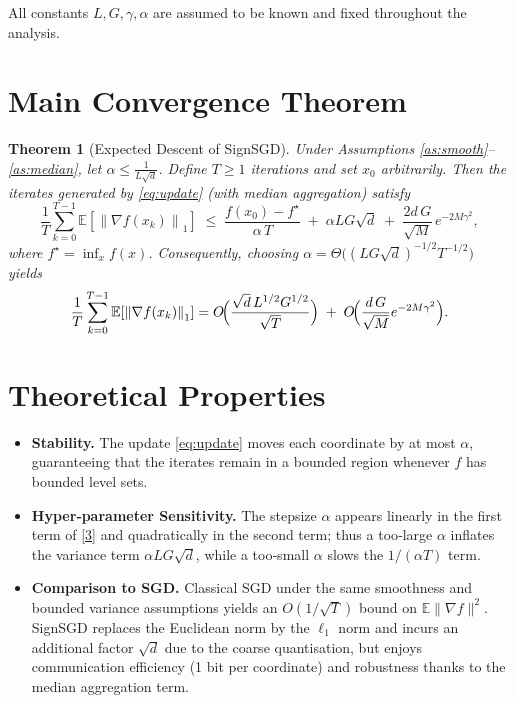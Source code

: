 \documentclass{article}
\newtheorem{theorem}{Theorem}
\newcommand{\E}{\mathbb{E}}
\newcommand{\norm}[1]{\left\lVert#1\right\rVert}
\begin{document}
All constants $L,G,\gamma,\alpha$ are assumed to be known and fixed throughout the analysis.

\section*{Main Convergence Theorem}
\begin{theorem}[Expected Descent of SignSGD]\label{thm:main}
Under Assumptions \ref{as:smooth}–\ref{as:median}, let $\alpha\le \frac{1}{L\sqrt{d}}$.
Define $T\ge 1$ iterations and set $x_{0}$ arbitrarily.
Then the iterates generated by \eqref{eq:update} (with median aggregation) satisfy
\[
\frac{1}{T}\sum_{k=0}^{T-1}\E\!\left[\norm{\nabla f(x_{k})}_{1}\right]
\;\le\;
\frac{f(x_{0})-f^{\star}}{\alpha\,T}
\;+\;
\alpha L G\sqrt{d}
\;+\;
\frac{2d\,G}{\sqrt{M}}\,e^{-2M\gamma^{2}},
\tag{3}
\]
where $f^{\star}=\inf_{x}f(x)$.  
Consequently, choosing $\alpha = \Theta\!\bigl((LG\sqrt{d})^{-1/2} T^{-1/2}\bigr)$ yields
\[
\frac{1}{T}\sum_{k=0}^{T-1}\E\!\left[\norm{\nabla f(x_{k})}_{1}\right]
= O\!\Bigl(\frac{\sqrt{d}\,L^{1/2}G^{1/2}}{\sqrt{T}}\Bigr)
\;+\;
O\!\Bigl(\frac{d\,G}{\sqrt{M}}e^{-2M\gamma^{2}}\Bigr).
\]
\end{theorem}

\section*{Theoretical Properties}
\begin{itemize}
\item \textbf{Stability.} The update \eqref{eq:update} moves each coordinate by at most $\alpha$, guaranteeing that the iterates remain in a bounded region whenever $f$ has bounded level sets.
\item \textbf{Hyper‑parameter Sensitivity.} The stepsize $\alpha$ appears linearly in the first term of \eqref{3} and quadratically in the second term; thus a too‑large $\alpha$ inflates the variance term $\alpha L G\sqrt{d}$, while a too‑small $\alpha$ slows the $1/(\alpha T)$ term.
\item \textbf{Comparison to SGD.} Classical SGD under the same smoothness and bounded variance assumptions yields an $O(1/\sqrt{T})$ bound on $\E\|\nabla f\|^{2}$.  SignSGD replaces the Euclidean norm by the $\ell_{1}$ norm and incurs an additional factor $\sqrt{d}$ due to the coarse quantisation, but enjoys communication efficiency (1 bit per coordinate) and robustness thanks to the median aggregation term.
\end{itemize}
\end{document}

